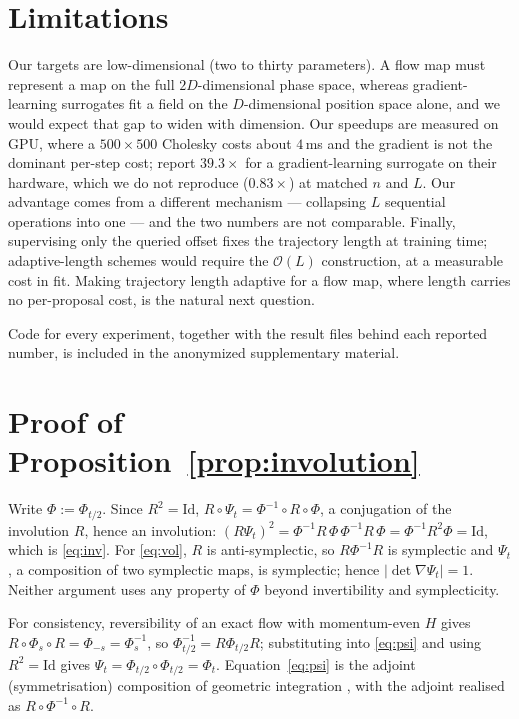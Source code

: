 \documentclass[mlabstract,onecolumn]{jmlr}
\newcommand{\Ham}{H}
\newcommand{\flip}{R}
\begin{document}
\section{Limitations}

Our targets are low-dimensional (two to thirty parameters). A flow map must
represent a map on the full $2D$-dimensional phase space, whereas
gradient-learning surrogates fit a field on the $D$-dimensional position space
alone, and we would expect that gap to widen with dimension. Our speedups are
measured on GPU, where a $500\times500$ Cholesky costs about $4$\,ms and the
gradient is not the dominant per-step cost; \citet{Li_2019} report $39.3\times$
for a gradient-learning surrogate on their hardware, which we do not reproduce
($0.83\times$) at matched $n$ and $L$. Our advantage comes from a different
mechanism --- collapsing $L$ sequential operations into one --- and the two
numbers are not comparable. Finally, supervising only the queried offset fixes
the trajectory length at training time; adaptive-length schemes would require
the $\mathcal{O}(L)$ construction, at a measurable cost in fit. Making
trajectory length adaptive for a flow map, where length carries no per-proposal
cost, is the natural next question.

Code for every experiment, together with the result files behind each reported
number, is included in the anonymized supplementary material.

\appendix

\section{Proof of Proposition~\ref{prop:involution}}
\label{app:proof}

Write $\Phi := \Phi_{t/2}$. Since $\flip^2 = \mathrm{Id}$,
$\flip \circ \Psi_t = \Phi^{-1} \circ \flip \circ \Phi$, a conjugation of the
involution $\flip$, hence an involution:
$(\flip \Psi_t)^2 = \Phi^{-1}\flip\,\Phi\,\Phi^{-1}\flip\,\Phi
= \Phi^{-1}\flip^2\Phi = \mathrm{Id}$, which is \eqref{eq:inv}. For
\eqref{eq:vol}, $\flip$ is anti-symplectic, so $\flip \Phi^{-1} \flip$ is
symplectic and $\Psi_t$, a composition of two symplectic maps, is symplectic;
hence $|\det \nabla \Psi_t| = 1$. Neither argument uses any property of $\Phi$
beyond invertibility and symplecticity.

For consistency, reversibility of an exact flow with momentum-even $\Ham$ gives
$\flip \circ \Phi_s \circ \flip = \Phi_{-s} = \Phi_s^{-1}$, so
$\Phi_{t/2}^{-1} = \flip \Phi_{t/2} \flip$; substituting into \eqref{eq:psi}
and using $\flip^2 = \mathrm{Id}$ gives
$\Psi_t = \Phi_{t/2}\circ\Phi_{t/2} = \Phi_t$. Equation~\eqref{eq:psi} is the
adjoint (symmetrisation) composition of geometric integration
\citep{HairerLubichWanner}, with the adjoint realised as
$\flip \circ \Phi^{-1} \circ \flip$.
\end{document}
